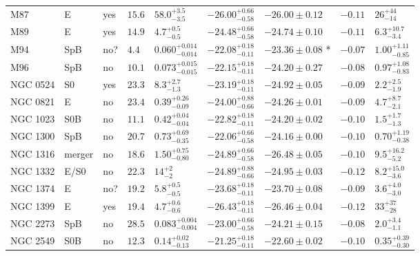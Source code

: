 \begin{table*}
\begin{center}
\begin{tabular}{lllllllll}
M87  &  E  &  yes   &  $15.6$  &  $58.0_{-3.5}^{+3.5}$   &  $-26.00_{-0.58}^{+0.66}$   &  $-26.00 \pm 0.12$   &  $-0.11$  &  $26_{-14}^{+44}$   \\ 
M89  &  E  &  yes   &  $14.9$  &  $4.7_{-0.5}^{+0.5}$   &  $-24.48_{-0.58}^{+0.66}$   &  $-24.74 \pm 0.10$   &  $-0.11$  &  $6.3_{-3.4}^{+10.7}$   \\ 
M94  &  SpB  &  no?  &  $4.4$  &  $0.060_{-0.014}^{+0.014}$   &  $-22.08_{-0.11}^{+0.18}$   &  $-23.36 \pm 0.08$  *  &  $-0.07$  &  $1.00_{-0.85}^{+1.11}$   \\ 
M96  &  SpB  &  no   &  $10.1$  &  $0.073_{-0.015}^{+0.015}$   &  $-22.15_{-0.11}^{+0.18}$   &  $-24.20 \pm 0.27$   &  $-0.08$  &  $0.97_{-0.83}^{+1.08}$   \\ 
NGC 0524  &  S0  &  yes   &  $23.3$  &  $8.3_{-1.3}^{+2.7}$   &  $-23.19_{-0.11}^{+0.18}$   &  $-24.92 \pm 0.05$   &  $-0.09$  &  $2.2_{-1.9}^{+2.5}$   \\ 
NGC 0821  &  E  &  no   &  $23.4$  &  $0.39_{-0.09}^{+0.26}$   &  $-24.00_{-0.66}^{+0.88}$   &  $-24.26 \pm 0.01$   &  $-0.09$  &  $4.7_{-2.1}^{+8.7}$   \\ 
NGC 1023  &  S0B  &  no   &  $11.1$  &  $0.42_{-0.04}^{+0.04}$   &  $-22.82_{-0.11}^{+0.18}$   &  $-24.20 \pm 0.02$   &  $-0.10$  &  $1.5_{-1.3}^{+1.7}$   \\ 
NGC 1300  &  SpB  &  no   &  $20.7$  &  $0.73_{-0.35}^{+0.69}$   &  $-22.06_{-0.58}^{+0.66}$   &  $-24.16 \pm 0.00$   &  $-0.10$  &  $0.70_{-0.38}^{+1.19}$   \\ 
NGC 1316  &  merger  &  no   &  $18.6$  &  $1.50_{-0.80}^{+0.75}$   &  $-24.89_{-0.58}^{+0.66}$   &  $-26.48 \pm 0.05$   &  $-0.10$  &  $9.5_{-5.2}^{+16.2}$   \\ 
NGC 1332  &  E/S0  &  no   &  $22.3$  &  $14_{-2}^{+2}$   &  $-24.89_{-0.66}^{+0.88}$   &  $-24.95 \pm 0.03$   &  $-0.12$  &  $8.2_{-3.6}^{+15.0}$   \\ 
NGC 1374  &  E  &  no?  &  $19.2$  &  $5.8_{-0.5}^{+0.5}$   &  $-23.68_{-0.11}^{+0.18}$   &  $-23.70 \pm 0.08$   &  $-0.09$  &  $3.6_{-3.0}^{+4.0}$   \\ 
NGC 1399  &  E  &  yes   &  $19.4$  &  $4.7_{-0.6}^{+0.6}$   &  $-26.43_{-0.11}^{+0.18}$   &  $-26.46 \pm 0.04$   &  $-0.12$  &  $33_{-28}^{+37}$   \\ 
NGC 2273  &  SpB  &  no   &  $28.5$  &  $0.083_{-0.004}^{+0.004}$   &  $-23.00_{-0.58}^{+0.66}$   &  $-24.21 \pm 0.15$   &  $-0.08$  &  $2.0_{-1.1}^{+3.4}$   \\ 
NGC 2549  &  S0B  &  no   &  $12.3$  &  $0.14_{-0.13}^{+0.02}$   &  $-21.25_{-0.11}^{+0.18}$   &  $-22.60 \pm 0.02$   &  $-0.10$  &  $0.35_{-0.30}^{+0.39}$   \\ 

\end{tabular}
\end{center}
\end{table*}
